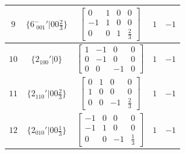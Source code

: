 \documentclass[fleqn,8pt]{jsarticle}
\begin{document}
\begin{longtable}{ccccc}
$ 9 $ & $ \{6^{-}_{\,\,001}{}'|0 0 \frac{2}{3}\} $ & $ \begin{bmatrix} 0 & 1 & 0 & 0 \\ -1 & 1 & 0 & 0 \\ 0 & 0 & 1 & \frac{2}{3} \end{bmatrix} $ & $ 1 $ & $ -1 $ \\ \hline
$ 10 $ & $ \{2{}_{100}{}'|0\} $ & $ \begin{bmatrix} 1 & -1 & 0 & 0 \\ 0 & -1 & 0 & 0 \\ 0 & 0 & -1 & 0 \end{bmatrix} $ & $ 1 $ & $ -1 $ \\ \hline
$ 11 $ & $ \{2{}_{110}{}'|0 0 \frac{2}{3}\} $ & $ \begin{bmatrix} 0 & 1 & 0 & 0 \\ 1 & 0 & 0 & 0 \\ 0 & 0 & -1 & \frac{2}{3} \end{bmatrix} $ & $ 1 $ & $ -1 $ \\ \hline
$ 12 $ & $ \{2{}_{010}{}'|0 0 \frac{1}{3}\} $ & $ \begin{bmatrix} -1 & 0 & 0 & 0 \\ -1 & 1 & 0 & 0 \\ 0 & 0 & -1 & \frac{1}{3} \end{bmatrix} $ & $ 1 $ & $ -1 $ \\
\end{longtable}
\end{document}

